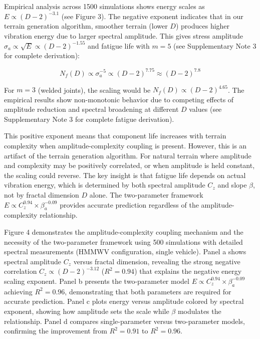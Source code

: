 \documentclass[11pt]{article}
\begin{document}
Empirical analysis across 1500 simulations shows energy scales as $E \propto (D-2)^{-3.1}$ (see Figure 3). The negative exponent indicates that in our terrain generation algorithm, smoother terrain (lower $D$) produces higher vibration energy due to larger spectral amplitude. This gives stress amplitude $\sigma_a \propto \sqrt{E} \propto (D-2)^{-1.55}$ and fatigue life with $m=5$ (see Supplementary Note 3 for complete derivation):

\begin{equation}
N_f(D) \propto \sigma_a^{-5} \propto (D-2)^{7.75} \approx (D-2)^{7.8}
\end{equation}

For $m=3$ (welded joints), the scaling would be $N_f(D) \propto (D-2)^{4.65}$. The empirical results show non-monotonic behavior due to competing effects of amplitude reduction and spectral broadening at different $D$ values (see Supplementary Note 3 for complete fatigue derivation).

This positive exponent means that component life increases with terrain complexity when amplitude-complexity coupling is present. However, this is an artifact of the terrain generation algorithm. For natural terrain where amplitude and complexity may be positively correlated, or when amplitude is held constant, the scaling could reverse. The key insight is that fatigue life depends on actual vibration energy, which is determined by both spectral amplitude $C_z$ and slope $\beta$, not by fractal dimension $D$ alone. The two-parameter framework $E \propto C_z^{0.94} \times \beta_a^{-0.09}$ provides accurate prediction regardless of the amplitude-complexity relationship.

Figure 4 demonstrates the amplitude-complexity coupling mechanism and the necessity of the two-parameter framework using 500 simulations with detailed spectral measurements (HMMWV configuration, single vehicle). Panel a shows spectral amplitude $C_z$ versus fractal dimension, revealing the strong negative correlation $C_z \propto (D-2)^{-3.12}$ ($R^2 = 0.94$) that explains the negative energy scaling exponent. Panel b presents the two-parameter model $E \propto C_z^{0.94} \times \beta_a^{-0.09}$ achieving $R^2 = 0.96$, demonstrating that both parameters are required for accurate prediction. Panel c plots energy versus amplitude colored by spectral exponent, showing how amplitude sets the scale while $\beta$ modulates the relationship. Panel d compares single-parameter versus two-parameter models, confirming the improvement from $R^2 = 0.91$ to $R^2 = 0.96$.
\end{document}
